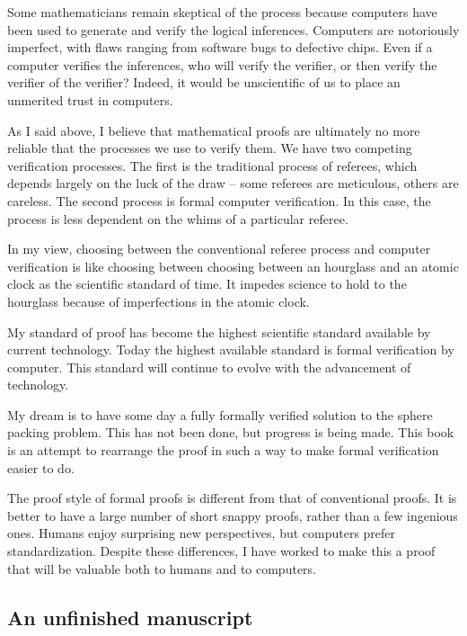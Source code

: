Some mathematicians remain skeptical of the process because
computers have been used to generate and verify the logical
inferences.  Computers are notoriously imperfect, with flaws ranging
from software bugs to defective chips.  Even if a computer verifies
the inferences, who will verify the verifier, or then verify the
verifier of the verifier?  Indeed, it would be unscientific of us to
place an unmerited trust in computers.

As I said above, I believe that mathematical proofs are ultimately
no more reliable that the processes we use to verify them.  We have
two competing verification processes.  The first is the traditional
process of referees, which depends largely on the luck of the draw
-- some referees are meticulous, others are careless.   The second
process is formal computer verification. In this case, the process
is less dependent on the whims of a particular referee.

In my view, choosing between the conventional referee process and
computer verification is like choosing between choosing between an
hourglass and an atomic clock as the scientific standard of time. It
impedes science to hold to the hourglass because of imperfections in
the atomic clock.

My standard of proof has become the highest scientific standard
available by current technology.  Today the highest available
standard is formal verification by computer.  This standard will
continue to evolve with the advancement of technology.

My dream is to have some day a fully formally verified solution to
the sphere packing problem.
This has not been done, but progress is being
made.  This book is an attempt to rearrange the proof
in such a way to make formal verification easier to do.

The proof style of formal proofs is different from that of
conventional proofs.  It is better to have a large number of short
snappy proofs, rather than a few ingenious ones.  Humans enjoy
surprising new perspectives, but computers prefer standardization.
Despite these differences, I have worked to make this a proof that
will be valuable both to humans and to computers.

\subsection{An unfinished manuscript}



